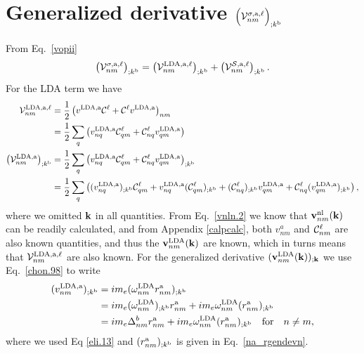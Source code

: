 \section{Generalized derivative \texorpdfstring{$\Big({\cal V}^{\sigma,\mathrm{a},\ell}_{nm}\Big)_{;k^{\mathrm{b}}}$}{(Vnm);kb}}\label{calvs} 
From Eq.~\eqref{vopii}
\begin{align}\label{a.1}
\left(
{\mathbf{\cal V}}^{\sigma,\mathrm{a},\ell}_{nm}
\right)_{;k^{\mathrm{b}}}
=
\left(
{\mathbf{\cal V}}^{\mathrm{LDA},\mathrm{a},\ell}_{nm}
\right)_{;k^{\mathrm{b}}}
+
\left(
{\mathbf{\cal V}}^{{\cal S},\mathrm{a},\ell}_{nm}
\right)_{;k^{\mathrm{b}}}
.
\end{align} 
For the LDA term we have
\begin{align}\label{a.2}
{\mathbf{\cal V}}^{\mathrm{LDA},\mathrm{a},\ell}_{nm}
&=
\frac{1}{2}\left(  
v^{\mathrm{LDA},\mathrm{a}}{\mathbf{\cal C}}^\ell+{\mathbf{\cal C}}^\ell v^{\mathrm{LDA},\mathrm{a}}
\right)_{nm}
\nonumber\\
&=
\frac{1}{2}\sum_q\left(  
v^{\mathrm{LDA},\mathrm{a}}_{nq}{\mathbf{\cal C}}^\ell_{qm}+{\mathbf{\cal C}}^\ell_{nq} v^{\mathrm{LDA},\mathrm{a}}_{qm}
\right)
\nonumber\\
\left({\mathbf{\cal V}}^{\mathrm{LDA},\mathrm{a}}_{nm}\right)_{;k^{\mathrm{b}}}
&=
\frac{1}{2}\sum_q\left(  
v^{\mathrm{LDA},\mathrm{a}}_{nq}{\mathbf{\cal C}}^\ell_{qm}+{\mathbf{\cal C}}^\ell_{nq} v^{\mathrm{LDA},\mathrm{a}}_{qm}
\right) _{;k^{\mathrm{b}}}
\nonumber\\
&=
\frac{1}{2}\sum_q\left(
(v^{\mathrm{LDA},\mathrm{a}}_{nq})_{;k^{\mathrm{b}}}{\mathbf{\cal C}}^\ell_{qm}
+   
v^{\mathrm{LDA},\mathrm{a}}_{nq}({\mathbf{\cal C}}^\ell_{qm})_{;k^{\mathrm{b}}}
+
({\mathbf{\cal C}}^\ell_{nq})_{;k^{\mathrm{b}}} v^{\mathrm{LDA},\mathrm{a}}_{qm}
+
{\mathbf{\cal C}}^\ell_{nq} (v^{\mathrm{LDA},\mathrm{a}}_{qm})_{;k^{\mathrm{b}}}
\right)
,
\end{align}   
where we omitted $\mathbf{k}$ in all quantities.
From Eq.~\eqref{vnln.2} we know that $\mathbf{v}^{\mathrm{nl}}_{nm}(\mathbf{k})$
 can be readily
calculated,
and from Appendix \ref{calpcalc}, both $v^a_{nm}$ and
${\mathbf{\cal C}}_{nm}^\ell$ are also known quantities, 
 and thus the
$\mathbf{v}^{\mathrm{LDA}}_{nm}(\mathbf{k})$ are known, which in turns means that 
${\mathbf{\cal V}}^{\mathrm{LDA},\mathrm{a},\ell}_{nm}$ are also known.
For the generalized derivative 
$(\mathbf{v}^{\mathrm{LDA}}_{nm}(\mathbf{k}))_{;\mathbf{k}}$ we use Eq.~\eqref{chon.98}
to write
\begin{align}\label{a.3}
(v^{\mathrm{LDA},\mathrm{a}}_{nm})_{;k^{\mathrm{b}}}
&=  
im_e(\omega^{\mathrm{LDA}}_{nm}r^{\mathrm{a}}_{nm})_{;k^{\mathrm{b}}}
\nonumber\\
&=  
im_e(\omega^{\mathrm{LDA}}_{nm})_{;k^{\mathrm{b}}} r^{\mathrm{a}}_{nm}
+  
im_e\omega^{\mathrm{LDA}}_{nm}(r^{\mathrm{a}}_{nm})_{;k^{\mathrm{b}}}
\nonumber\\
&=  
im_e\Delta^b_{nm}r^{\mathrm{a}}_{nm}
+ 
im_e\omega^{\mathrm{LDA}}_{nm}(r^{\mathrm{a}}_{nm})_{;k^{\mathrm{b}}}
\quad\mathrm{for}\quad n\ne m
,
\end{align} 
where we used Eq \eqref{eli.13} and $(r^{\mathrm{a}}_{nm})_{;k^{\mathrm{b}}}$ is given
in Eq.~\eqref{na_rgendevn}.

